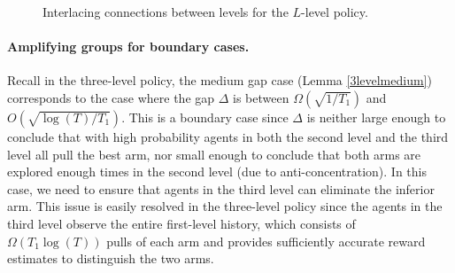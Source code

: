 \begin{figure}[H]
\centering
{}
\caption{Interlacing connections between levels for the $L$-level policy.}
\label{fig:llevel-connecting}
\end{figure}

\paragraph{Amplifying groups for boundary cases.} Recall in the
three-level policy, the medium gap case (Lemma \ref{3levelmedium})
corresponds to the case where the gap $\Delta$ is between
$\Omega\left(\sqrt{{1}/{T_1}}\right)$ and
$O\left(\sqrt{{\log(T)}/{T_1}}\right)$. This is a boundary case since
$\Delta$ is neither large enough to conclude that with high
probability agents in both the second level and the third level all
pull the best arm, nor small enough to conclude that both arms are
explored enough times in the second level (due to
anti-concentration). In this case, we need to ensure that agents in
the third level can eliminate the inferior arm. This issue is easily
resolved in the three-level policy since the agents in the third level
observe the entire first-level history, which consists of
$\Omega(T_1\log(T))$ pulls of each arm and provides sufficiently
accurate reward estimates to distinguish the two arms.

